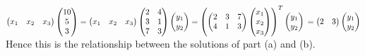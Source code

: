 \documentclass[leqno,12pt]{article}
\begin{document}
\begin{enumerate}
\begin{enumerate}
$\begin{pmatrix}x_1&x_2&x_3\end{pmatrix}\begin{pmatrix}10\\5\\3\end{pmatrix}=\begin{pmatrix}x_1&x_2&x_3\end{pmatrix}\begin{pmatrix}2&4\\3&1\\7&3\end{pmatrix}\begin{pmatrix}y_1\\y_2\end{pmatrix}=\left(\begin{pmatrix}2&3&7\\4&1&3\end{pmatrix}\begin{pmatrix}x_1\\x_2\\x_3\end{pmatrix}\right)^T\begin{pmatrix}y_1\\y_2\end{pmatrix}\\=\begin{pmatrix}2&3\end{pmatrix}\begin{pmatrix}y_1\\y_2\end{pmatrix}$\\
Hence this is the relationship between the solutions of part (a) and (b).\\
\end{enumerate}

\pagebreak


\end{enumerate}
\end{document}
